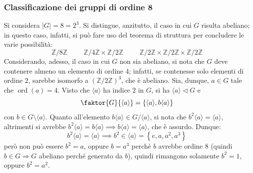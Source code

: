 \documentclass[12pt]{scrartcl}
\theoremstyle{style}
\numberwithin{equation}{subsection}
\begin{document}
\subsubsection{Classificazione dei gruppi di ordine 8}
Si considera $\lvert G \rvert  = 8 = 2^3$.
Si distingue, anzitutto, il caso in cui $G$ risulta abeliano; in questo caso, infatti, si pu\`o fare uso del teorema di struttura per concludere le varie possibilit\`a:
\[
\mathbb{Z}/8\mathbb{Z} \hspace{1cm} \mathbb{Z}/4\mathbb{Z} \times \mathbb{Z}/2\mathbb{Z}\hspace{1cm}\mathbb{Z}/2\mathbb{Z} \times \mathbb{Z}/2\mathbb{Z} \times \mathbb{Z}/2\mathbb{Z}
\] 
Considerando, adesso, il caso in cui $G$ non sia abeliano, si nota che $G$ deve contenere almeno un elemento di ordine $4$; infatti, se contenesse solo elementi di ordine $2$, sarebbe isomorfo a $(\mathbb{Z}/2\mathbb{Z})^3$, che \`e abeliano.
Sia, dunque, $a \in G $ tale che $\operatorname{ord}(a) = 4$.
Visto che $\langle a \rangle$ ha indice $2$ in $G$, si ha $\langle a \rangle\lhd G$ e 
\[
	\faktor{G}{\langle a \rangle} = \left\{ \langle a \rangle, b \langle a \rangle \right\} 
\] 
con $b \in G \setminus \langle a \rangle$.
Quanto all'elemento $b\langle a \rangle \in G / \langle a \rangle$, si nota che $b^2 \langle a \rangle = \langle a \rangle$, altrimenti si avrebbe $b^2 \langle a \rangle= b\langle a \rangle\implies b\langle a \rangle = \langle a \rangle$, che \`e assurdo.
Dunque:
\[
b^2 \langle a \rangle = \langle a \rangle\implies b^2 \in \langle a \rangle = \left\{ e , a , a^2 , a^3 \right\} 
\] 
per\`o non pu\`o essere $b^2 = a$, oppure $b=a^3$ perch\'e $b$ avrebbe ordine $8$ (quindi $b\in G\Rightarrow G$ abeliano perch\'e generato da $b$), quindi rimangono solamente $b^2 = 1$, oppure $b^2 = a^2$.
\end{document}
